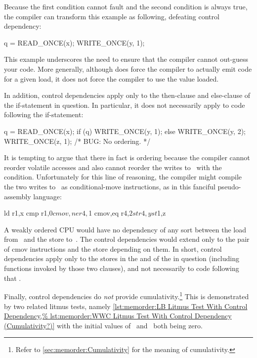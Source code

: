 Because the first condition cannot fault and the second condition is
always true, the compiler can transform this example as following,
defeating control dependency:

\begin{VerbatimN}
q = READ_ONCE(x);
WRITE_ONCE(y, 1);
\end{VerbatimN}

This example underscores the need to ensure that the compiler cannot
out-guess your code.
More generally, although  does force
the compiler to actually emit code for a given load, it does not force
the compiler to use the value loaded.

In addition, control dependencies apply only to the then-clause and
else-clause of the if-statement in question.
In particular, it does
not necessarily apply to code following the if-statement:

\begin{VerbatimN}
q = READ_ONCE(x);
if (q) {
	WRITE_ONCE(y, 1);
} else {
	WRITE_ONCE(y, 2);
}
WRITE_ONCE(z, 1);  /* BUG: No ordering. */
\end{VerbatimN}

It is tempting to argue that there in fact is ordering because the
compiler cannot reorder volatile accesses and also cannot reorder
the writes to~ with the condition.
Unfortunately for this line
of reasoning, the compiler might compile the two writes to~ as
conditional-move instructions, as in this fanciful pseudo-assembly
language:

\begin{VerbatimN}
ld r1,x
cmp r1,$0
cmov,ne r4,$1
cmov,eq r4,$2
st r4,y
st $1,z
\end{VerbatimN}

A weakly ordered CPU would have no dependency of any sort between the load
from~ and the store to~.
The control dependencies would extend
only to the pair of cmov instructions and the store depending on them.
In short, control dependencies apply only to the stores in the 
and  of the  in question (including functions invoked by
those two clauses), and not necessarily to code following that .

Finally, control dependencies do \emph{not} provide cumulativity.\footnote{
	Refer to \cref{sec:memorder:Cumulativity} for
	the meaning of cumulativity.}
This is demonstrated by two related litmus tests, namely
\cref{lst:memorder:LB Litmus Test With Control Dependency,%
lst:memorder:WWC Litmus Test With Control Dependency (Cumulativity?)}
with the initial values
of~ and~ both being zero.

